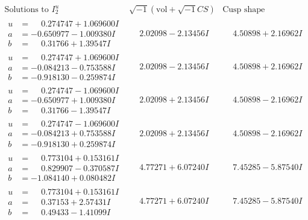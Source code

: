 \documentclass[1p]{elsarticle_modified}
\theoremstyle{definition}
\newcommand{\I}{\sqrt{-1}}
\begin{document}
$$\begin{array}{c|c|c}  
\text{Solutions to }I^u_{2}& \I (\text{vol} + \sqrt{-1}CS) & \text{Cusp shape}\\
 \hline 
\begin{aligned}
u &= \phantom{-}0.274747 + 1.069600 I \\
a &= -0.650977 - 1.009380 I \\
b &= \phantom{-}0.31766 + 1.39547 I\end{aligned}
 & \phantom{-}2.02098 - 2.13456 I & \phantom{-}4.50898 + 2.16962 I \\ \hline\begin{aligned}
u &= \phantom{-}0.274747 + 1.069600 I \\
a &= -0.084213 - 0.753588 I \\
b &= -0.918130 - 0.259874 I\end{aligned}
 & \phantom{-}2.02098 - 2.13456 I & \phantom{-}4.50898 + 2.16962 I \\ \hline\begin{aligned}
u &= \phantom{-}0.274747 - 1.069600 I \\
a &= -0.650977 + 1.009380 I \\
b &= \phantom{-}0.31766 - 1.39547 I\end{aligned}
 & \phantom{-}2.02098 + 2.13456 I & \phantom{-}4.50898 - 2.16962 I \\ \hline\begin{aligned}
u &= \phantom{-}0.274747 - 1.069600 I \\
a &= -0.084213 + 0.753588 I \\
b &= -0.918130 + 0.259874 I\end{aligned}
 & \phantom{-}2.02098 + 2.13456 I & \phantom{-}4.50898 - 2.16962 I \\ \hline\begin{aligned}
u &= \phantom{-}0.773104 + 0.153161 I \\
a &= \phantom{-}0.829907 - 0.370587 I \\
b &= -1.084140 + 0.080482 I\end{aligned}
 & \phantom{-}4.77271 + 6.07240 I & \phantom{-}7.45285 - 5.87540 I \\ \hline\begin{aligned}
u &= \phantom{-}0.773104 + 0.153161 I \\
a &= \phantom{-}0.37153 + 2.57431 I \\
b &= \phantom{-}0.49433 - 1.41099 I\end{aligned}
 & \phantom{-}4.77271 + 6.07240 I & \phantom{-}7.45285 - 5.87540 I \\ \hline\begin{aligned}

\end{aligned}
\end{array}$$
\end{document}
